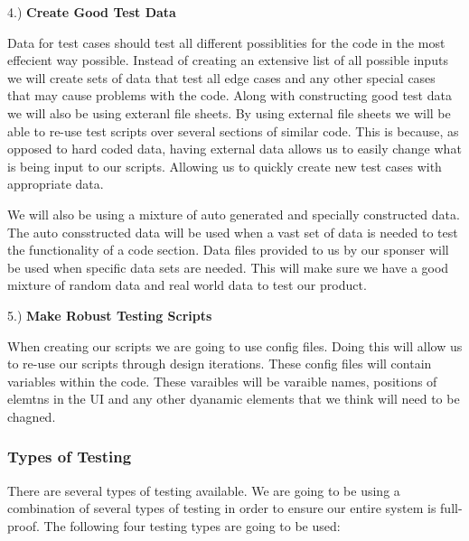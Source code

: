 \vspace{10mm}

4.) \textbf{Create Good Test Data}
\begin{adjustwidth}{3.5em}{0pt}
  Data for test cases should test all different possiblities for the code in the most effecient way possible. Instead of creating an extensive list of all possible inputs we will create sets of data that test all edge cases and any other special cases that may cause problems with the code. Along with constructing good test data we will also be using exteranl file sheets. By using external file sheets we will be able to re-use test scripts over several sections of similar code. This is because, as opposed to hard coded data, having external data allows us to easily change what is being input to our scripts. Allowing us to quickly create new test cases with appropriate data.
  \par We will also be using a mixture of auto generated and specially constructed data. The auto consstructed data will be used when a vast set of data is needed to test the functionality of a code section. Data files provided to us by our sponser will be used when specific data sets are needed. This will make sure we have a good mixture of random data and real world data to test our product.
\end{adjustwidth}

\vspace{10mm}

5.) \textbf{Make Robust Testing Scripts}
\begin{adjustwidth}{3.5em}{0pt}
  When creating our scripts we are going to use config files. Doing this will allow us to re-use our scripts through design iterations. These config files will contain variables within the code. These varaibles will be varaible names, positions of elemtns in the UI and any other dyanamic elements that we think will need to be chagned.
\end{adjustwidth}

\subsubsection{Types of Testing}
  There are several types of testing available. We are going to be using a combination of several types of testing in order to ensure our entire system is full-proof. The following four testing types are going to be used:\newline

